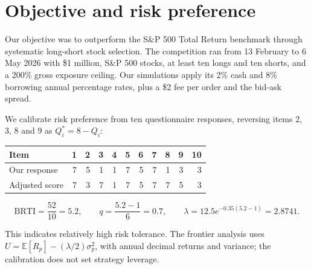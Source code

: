 \section{Objective and risk preference}
\label{sec:objective}

Our objective was to outperform the S\&P 500 Total Return benchmark through
systematic long-short stock selection. The competition ran from
13 February to 6 May 2026 with \$1 million, S\&P 500 stocks, at least ten longs
and ten shorts, and a 200\% gross exposure ceiling. Our simulations apply its
2\% cash and 8\% borrowing annual percentage rates, plus a \$2 fee per order
and the bid-ask spread.

We calibrate risk preference from ten questionnaire responses, reversing
items 2, 3, 8 and 9 as \(Q_i^*=8-Q_i\):
\begin{center}
\small
\begin{tabular}{lrrrrrrrrrr}
\toprule
Item & 1 & 2 & 3 & 4 & 5 & 6 & 7 & 8 & 9 & 10\\
\midrule
Our response & 7 & 5 & 1 & 1 & 7 & 5 & 7 & 1 & 3 & 3\\
Adjusted score & 7 & 3 & 7 & 1 & 7 & 5 & 7 & 7 & 5 & 3\\
\bottomrule
\end{tabular}
\end{center}
\vspace{-0.4em}
\begin{equation}
 \mathrm{BRTI}=\frac{52}{10}=5.2,\qquad
 q=\frac{5.2-1}{6}=0.7,\qquad
 \lambda=12.5e^{-0.35(5.2-1)}=2.8741.
\end{equation}

This indicates relatively high risk tolerance. The frontier analysis uses
\(U=\mathbb{E}[R_p]-(\lambda/2)\sigma_p^2\), with annual decimal returns
and variance; the calibration does not set strategy leverage.
